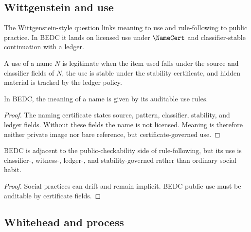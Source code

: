\subsection{Wittgenstein and use}
\label{subsec:philosophy-wittgenstein-use}

\begin{definition}
\label{def:philosophy-use-rule-question}
The Wittgenstein-style question links meaning to use and rule-following
to public practice. In BEDC it lands on licensed use under
\(\NameCert\) and classifier-stable continuation with a ledger.
\end{definition}

\begin{definition}
\label{def:philosophy-bedc-use}
A use of a name \(N\) is legitimate when the item used falls under the
source and classifier fields of \(N\), the use is stable under the
stability certificate, and hidden material is tracked by the ledger
policy.
\end{definition}

\begin{theorem}
\label{thm:philosophy-meaning-certified-use}
In BEDC, the meaning of a name is given by its auditable use rules.
\end{theorem}
\begin{proof}
The naming certificate states source, pattern, classifier, stability,
and ledger fields. Without these fields the name is not licensed.
Meaning is therefore neither private image nor bare reference, but
certificate-governed use.
\end{proof}

\begin{corollary}
\label{cor:philosophy-rule-following-audited}
BEDC is adjacent to the public-checkability side of rule-following, but
its use is classifier-, witness-, ledger-, and stability-governed
rather than ordinary social habit.
\end{corollary}
\begin{proof}
Social practices can drift and remain implicit. BEDC public use must
be auditable by certificate fields.
\end{proof}

\subsection{Whitehead and process}
\label{subsec:philosophy-whitehead-process}

